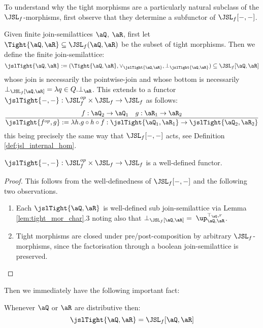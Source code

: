 \documentclass{article}
\begin{document}
To understand why the tight morphisms are a particularly natural subclass of the $\JSL_f$-morphisms, first observe that they determine a subfunctor of $\JSL_f[-,-]$.

\bigskip

\begin{definition}
\item
Given finite join-semilattices $\aQ$, $\aR$, first let $\Tight{\aQ,\aR} \subseteq \JSL_f(\aQ,\aR)$ be the subset of tight morphisms. Then we define the finite join-semilattice:
\[
\jslTight{\aQ,\aR} 
:= (\Tight{\aQ,\aR},\lor_{\jslTight{\aQ,\aR}},\bot_{\jslTight{\aQ,\aR}})
\subseteq \JSL_f[\aQ,\aR]
\]
whose join is necessarily the pointwise-join and whose bottom is necessarily $\bot_{\JSL_f[\aQ,\aR]} = \lambda q \in Q.\bot_\aR$. This extends to a functor $\jslTight{-,-} : \JSL_f^{op} \times \JSL_f \to \JSL_f$ as follows:
\[
\dfrac{f : \aQ_2 \to \aQ_1 \quad g : \aR_1 \to \aR_2}
{\jslTight{f^{op},g} := \lambda h. g \circ h \circ f    : \jslTight{\aQ_1,\aR_1} \to \jslTight{\aQ_2,\aR_2} }
\]
this being precisely the same way that $\JSL_f[-,-]$ acts, see Definition \ref{def:jsl_internal_hom}. \endbox
\end{definition}

\bigskip

\begin{lemma}
$\jslTight{-,-} : \JSL_f^{op} \times \JSL_f \to \JSL_f$ is a well-defined functor.
\end{lemma}

\begin{proof}
This follows from the well-definedness of $\JSL_f[-,-]$ and the following two observations.
\begin{enumerate}
\item
Each $\jslTight{\aQ,\aR}$ is well-defined sub join-semilattice via Lemma \ref{lem:tight_mor_char}.3 noting also that  $\bot_{\JSL_f[\aQ,\aR]} = \; \up_{\aQ,\aR}^{\top_\aQ,r}$.
\item
Tight morphisms are closed under pre/post-composition by arbitrary $\JSL_f$-morphisms, since the factorisation through a boolean join-semilattice is preserved.
\end{enumerate}
\end{proof}

Then we immediately have the following important fact:

\begin{corollary}
\label{cor:jsl_equ_tight_distributive}
Whenever $\aQ$ or $\aR$ are distributive then:
\[
\jslTight{\aQ,\aR} = \JSL_f[\aQ,\aR]
\]
\end{corollary}
\end{document}
